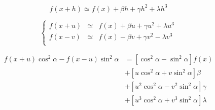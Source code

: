 \documentclass[aps,12pt]{revtex4}
\begin{document}
\begin{equation}
	f(x+h) \simeq f(x) + \beta h + \gamma h^2 + \lambda h^3
\end{equation}

\begin{equation}
\left\lbrace
\begin{array}{rcl}
	f(x+u) &\simeq & f(x) + \beta u + \gamma u^2 + \lambda u^3\\
	f(x-v) &\simeq & f(x) - \beta v + \gamma v^2 - \lambda v^3\\
\end{array}
\right.
\end{equation}

\begin{equation}
\begin{array}{rl}
	f(x+u) \cos^2\alpha - f(x-u) \sin^2\alpha 
	& = \left\lbrack \cos^2\alpha - \sin^2\alpha \right \rbrack f(x) \\
    &	+ \left\lbrack u\cos^2\alpha + v \sin^2\alpha \right\rbrack \beta\\
    &   + \left\lbrack u^2\cos^2\alpha - v^2 \sin^2\alpha \right\rbrack \gamma\\
    &   + \left\lbrack u^3\cos^2\alpha + v^3 \sin^2\alpha \right\rbrack \lambda\\
 \end{array}
\end{equation}
\end{document}
